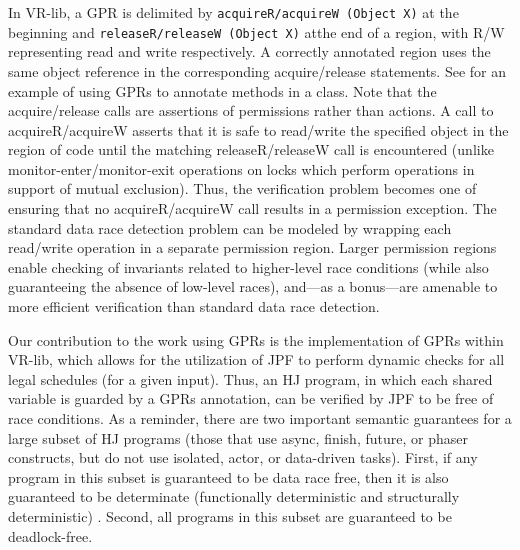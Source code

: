 In VR-lib, a GPR is delimited by {\tt acquireR/acquireW (Object X)} at the beginning
and {\tt releaseR/releaseW (Object X)} atthe end of a region,
with R/W representing read and write respectively. A correctly annotated region
uses the same object reference in the corresponding acquire/release statements.
See  for an example of using GPRs to annotate methods
in a class. Note that the acquire/release calls are assertions of permissions rather than actions. A call to acquireR/acquireW asserts that it is
safe to read/write the specified object in the region of code until the matching
releaseR/releaseW call is encountered (unlike monitor-enter/monitor-exit
operations on locks which perform operations in support of mutual exclusion).
Thus, the verification problem becomes one of ensuring that no
acquireR/acquireW call results in a permission exception. The standard data race
detection problem can be modeled by wrapping each read/write operation in a
separate permission region. Larger permission regions enable checking of
invariants related to higher-level race conditions (while also guaranteeing the
absence of low-level races), and---as a bonus---are amenable to more efficient
verification than standard data race detection.

Our contribution to the work using GPRs is the implementation of GPRs within
VR-lib, which allows for the utilization of JPF to perform dynamic checks for
all legal schedules (for a given input). Thus, an HJ program, in which each
shared variable is guarded by a GPRs annotation, can be verified by JPF to be
free of race conditions. As a reminder, there are two important semantic
guarantees for a large subset of HJ programs (those that use async, finish,
future, or phaser constructs, but do not use isolated, actor, or data-driven
tasks). First, if any program in this subset is guaranteed to be data race
free, then it is also guaranteed to be determinate (functionally deterministic
and structurally deterministic) \cite{determinacy}. Second, all programs in
this subset are guaranteed to be deadlock-free. 

 
